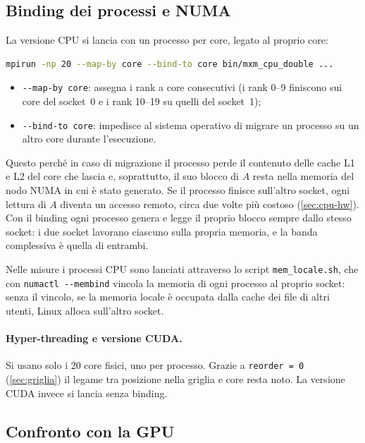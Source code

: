 \documentclass[11pt,a4paper]{article}
\begin{document}
\subsection{Binding dei processi e NUMA}\label{sec:binding}

La versione CPU si lancia con un processo per core, legato al proprio core:
\begin{lstlisting}[language=bash,numbers=none,frame=none]
mpirun -np 20 --map-by core --bind-to core bin/mxm_cpu_double ...
\end{lstlisting}
\begin{itemize}
  \item \texttt{-{}-map-by core}: assegna i rank a core consecutivi (i rank
        0--9 finiscono sui core del socket~0 e i rank 10--19 su quelli del
        socket~1);
  \item \texttt{-{}-bind-to core}: impedisce al sistema operativo di migrare un
        processo su un altro core durante l'esecuzione.
\end{itemize}

Questo perché in caso di migrazione il processo perde il contenuto delle cache L1 e L2 del
core che lascia e, soprattutto, il suo blocco di $A$ resta nella memoria del
nodo NUMA in cui è stato generato.
Se il processo finisce sull'altro socket, ogni
lettura di $A$ diventa un accesso remoto, circa due volte più costoso
(\cref{sec:cpu-hw}). Con il binding ogni processo genera e legge il proprio
blocco sempre dallo stesso socket: i due socket lavorano ciascuno sulla
propria memoria, e la banda complessiva è quella di entrambi.

Nelle misure i processi CPU sono lanciati attraverso lo script
\texttt{mem\_locale.sh}, che con \texttt{numactl -{}-membind} vincola la
memoria di ogni processo al proprio socket: senza il vincolo, se la memoria
locale è occupata dalla cache dei file di altri utenti, Linux alloca
sull'altro socket.

\paragraph{Hyper-threading e versione CUDA.} Si usano solo i 20 core fisici,
uno per processo. Grazie a \texttt{reorder = 0} (\cref{sec:griglia}) il legame
tra posizione nella griglia e core resta noto. La versione CUDA invece si lancia
senza binding.

\subsection{Confronto con la GPU}\label{sec:cpu-gpu}
\end{document}
